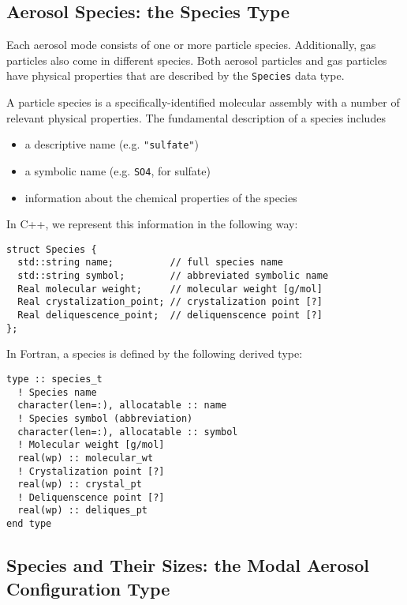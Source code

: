 \subsection{Aerosol Species: the Species Type}

Each aerosol mode consists of one or more particle species. Additionally,
gas particles also come in different species. Both aerosol particles and
gas particles have physical properties that are described by the
\texttt{Species} data type.

A particle species is a specifically-identified molecular assembly with
a number of relevant physical properties. The fundamental description of a
species includes

\begin{itemize}
  \item a descriptive name (e.g. \texttt{"sulfate"})
  \item a symbolic name (e.g. \texttt{SO4}, for sulfate)
  \item information about the chemical properties of the species
\end{itemize}

In C++, we represent this information in the following way:

\begin{lstlisting}
struct Species {
  std::string name;          // full species name
  std::string symbol;        // abbreviated symbolic name
  Real molecular weight;     // molecular weight [g/mol]
  Real crystalization_point; // crystalization point [?]
  Real deliquescence_point;  // deliquenscence point [?]
};
\end{lstlisting}

In Fortran, a species is defined by the following derived type:
\begin{lstlisting}
type :: species_t
  ! Species name
  character(len=:), allocatable :: name
  ! Species symbol (abbreviation)
  character(len=:), allocatable :: symbol
  ! Molecular weight [g/mol]
  real(wp) :: molecular_wt
  ! Crystalization point [?]
  real(wp) :: crystal_pt
  ! Deliquenscence point [?]
  real(wp) :: deliques_pt
end type
\end{lstlisting}

\subsection{Species and Their Sizes: the Modal Aerosol Configuration Type}

